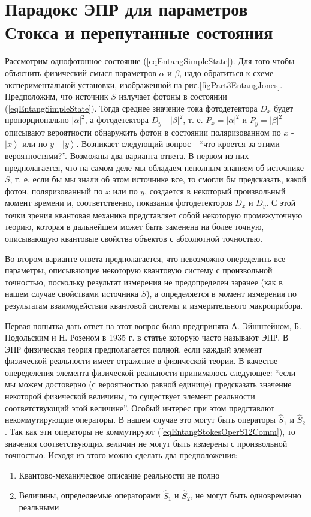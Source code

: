\section{Парадокс ЭПР для параметров
  Стокса и перепутанные состояния}
\label{sec:part3:epr}
Рассмотрим однофотонное состояние (\ref{eqEntangSimpleState}). 
Для того чтобы объяснить
физический смысл параметров $\alpha$ и $\beta$, надо обратиться к схеме
экспериментальной установки, изображенной на
рис.\ref{figPart3EntangJones}. Предположим, что источник $S$ излучает
фотоны в состоянии (\ref{eqEntangSimpleState}). Тогда среднее значение
тока фотодетектора $D_x$ будет пропорционально
$\left|\alpha\right|^2$, а фотодетектора $D_y$ -
$\left|\beta\right|^2$, т. е. $P_x = \left|\alpha\right|^2$ и $P_y =
\left|\beta\right|^2$ описывают вероятности обнаружить фотон в
состоянии поляризованном по $x$ - $\left|x\right>$ или по $y$ -
$\left|y\right>$. Возникает следующий вопрос - ``что кроется за этими
вероятностями?''. Возможны два варианта ответа. В первом из них
предполагается, что на самом деле мы обладаем неполным знанием об источнике $S$,
т. е. если бы мы знали об этом источнике все, то смогли бы
предсказать, какой фотон, поляризованный по $x$ или по $y$, создается в
некоторый произвольный момент времени и, соответственно, показания
фотодетекторов $D_x$ и $D_y$. С этой точки зрения
квантовая механика представляет собой некоторую промежуточную
теорию, которая в дальнейшем может быть заменена на более точную,
описывающую квантовые свойства объектов с абсолютной точностью. 

Во втором варианте ответа предполагается, что невозможно опеределить
все параметры, описывающие некоторую квантовую систему с произвольной
точностью, поскольку результат измерения не предопределен заранее (как
в нашем случае свойствами источника $S$), а определяется в момент
измерения по результатам взаимодействия квантовой системы и
измерительного макроприбора. 

Первая попытка дать ответ на этот вопрос была предпринята 
А. Эйнштейном, Б. Подольским и Н. Розеном в 1935 г. в статье которую
часто называют ЭПР\cite{bEPR}.  
В ЭПР физическая теория предполагается
полной, если каждый элемент физической реальности имеет отражение в
физической теории. В качестве опеределения элемента физической
реальности принималось следующее: ``если мы можем достоверно (с
вероятностью равной единице) предсказать значение некоторой физической
величины, то существует элемент реальности соответствующий этой
величине''\cite{bBelokTimHrus}. Особый интерес при этом представлют
некоммутирующие операторы. В нашем случае это могут быть операторы
$\hat{S}_1$ и $\hat{S}_2$. Так как эти операторы не коммутируют
(\ref{eqEntangStokesOperS12Comm}), то
значения соответствующих величин не могут быть измерены с произвольной
точностью. Исходя из этого можно сделать два предположения:
\begin{enumerate}
\item Квантово-механическое описание реальности не полно
\item Величины, определяемые операторами $\hat{S}_1$ и $\hat{S}_2$, не
  могут быть одновременно реальными
\end{enumerate}

